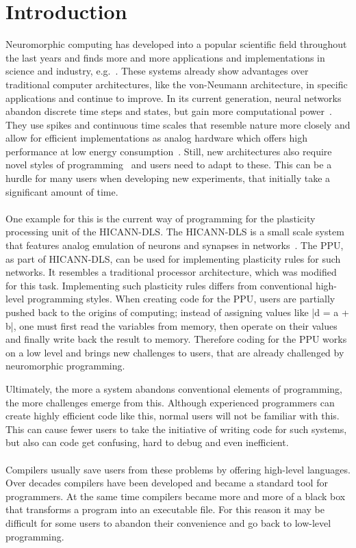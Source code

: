 \chapter{Introduction}
\label{chapter:introduction}

Neuromorphic computing has developed into a popular scientific field throughout the last years and finds more and more applications and implementations in science and industry, e.g.~\cite{6905473}.
These systems already show advantages over traditional computer architectures, like the von-Neumann architecture, in specific applications and continue to improve.
In its current generation, neural networks abandon discrete time steps and states, but gain more computational power~\cite{Maass19971659}.
They use spikes and continuous time scales that resemble nature more closely and allow for efficient implementations as analog hardware which offers high performance at low energy consumption~\cite{NIPS2015_5862}.
Still, new architectures also require novel styles of programming~\cite{Amir2013CognitiveCP} and users need to adapt to these.
This can be a hurdle for many users when developing new experiments, that initially take a significant amount of time. 
\\
\\
One example for this is the current way of programming for the plasticity processing unit of the \ac{HICANN-DLS}. 
The \ac{HICANN-DLS} is a small scale system that features analog emulation of neurons and synapses in networks~\cite{PPU}.
The \ac{PPU}, as part of \ac{HICANN-DLS}, can be used for implementing plasticity rules for such networks.
It resembles a traditional processor architecture, which was modified for this task.
Implementing such plasticity rules differs from conventional high-level programming styles. 
When creating code for the \ac{PPU}, users are partially pushed back to the origins of computing;
instead of assigning values like |d = a + b|, one must first read the variables from memory, then operate on their values and finally write back the result to memory.
Therefore coding for the \ac{PPU} works on a low level and brings new challenges to users, that are already challenged by neuromorphic programming.

Ultimately, the more a system abandons conventional elements of programming, the more challenges emerge from this.
Although experienced programmers can create highly efficient code like this, normal users will not be familiar with this.
This can cause fewer users to take the initiative of writing code for such systems, but also can code get confusing, hard to debug and even inefficient.
\\
\\
Compilers usually save users from these problems by offering high-level languages.
Over decades compilers have been developed and became a standard tool for programmers.
At the same time compilers became more and more of a black box that transforms a program into an executable file.
For this reason it may be difficult for some users to abandon their convenience and go back to low-level programming.


